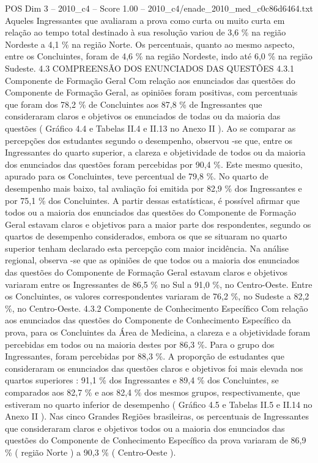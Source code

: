 \begin{textsample}{POS Dim 3 – 2010\_c4 – Score 1.00 – 2010\_c4/enade\_2010\_med\_c0c86d6464.txt}
Aqueles Ingressantes que avaliaram a prova como curta ou muito curta em relação ao tempo total destinado à sua resolução variou de 3,6 \% na região Nordeste a 4,1 \% na região Norte.
Os percentuais, quanto ao mesmo aspecto, entre os Concluintes, foram de 4,6 \% na região Nordeste, indo até 6,0 \% na região Sudeste. 4.3 COMPREENSÃO DOS ENUNCIADOS DAS QUESTÕES 4.3.1 Componente de Formação Geral Com relação aos enunciados das questões do Componente de Formação Geral, as opiniões foram positivas, com percentuais que foram dos 78,2 \% de Concluintes aos 87,8 \% de Ingressantes que consideraram claros e objetivos os enunciados de todas ou da maioria das questões ( Gráfico 4.4 e Tabelas II.4 e II.13 no Anexo II ).
Ao se comparar as percepções dos estudantes segundo o desempenho, observou -se que, entre os Ingressantes do quarto superior, a clareza e objetividade de todos ou da maioria dos enunciados das questões foram percebidas por 90,4 \%.
Este mesmo quesito, apurado para os Concluintes, teve percentual de 79,8 \%.
No quarto de desempenho mais baixo, tal avaliação foi emitida por 82,9 \% dos Ingressantes e por 75,1 \% dos Concluintes.
A partir dessas estatísticas, é possível afirmar que todos ou a maioria dos enunciados das questões do Componente de Formação Geral estavam claros e objetivos para a maior parte dos respondentes, segundo os quartos de desempenho considerados, embora os que se situaram no quarto superior tenham declarado esta percepção com maior incidência.
Na análise regional, observa -se que as opiniões de que todos ou a maioria dos enunciados das questões do Componente de Formação Geral estavam claros e objetivos variaram entre os Ingressantes de 86,5 \% no Sul a 91,0 \%, no Centro-Oeste.
Entre os Concluintes, os valores correspondentes variaram de 76,2 \%, no Sudeste a 82,2 \%, no Centro-Oeste. 4.3.2 Componente de Conhecimento Específico Com relação aos enunciados das questões do Componente de Conhecimento Específico da prova, para os Concluintes da Área de Medicina, a clareza e a objetividade foram percebidas em todos ou na maioria destes por 86,3 \%.
Para o grupo dos Ingressantes, foram percebidas por 88,3 \%.
A proporção de estudantes que consideraram os enunciados das questões claros e objetivos foi mais elevada nos quartos superiores : 91,1 \% dos Ingressantes e 89,4 \% dos Concluintes, se comparados aos 82,7 \% e aos 82,4 \% dos mesmos grupos, respectivamente, que estiveram no quarto inferior de desempenho ( Gráfico 4.5 e Tabelas II.5 e II.14 no Anexo II ).
Nas cinco Grandes Regiões brasileiras, os percentuais de Ingressantes que consideraram claros e objetivos todos ou a maioria dos enunciados das questões do Componente de Conhecimento Específico da prova variaram de 86,9 \% ( região Norte ) a 90,3 \% ( Centro-Oeste ).

\end{textsample}
